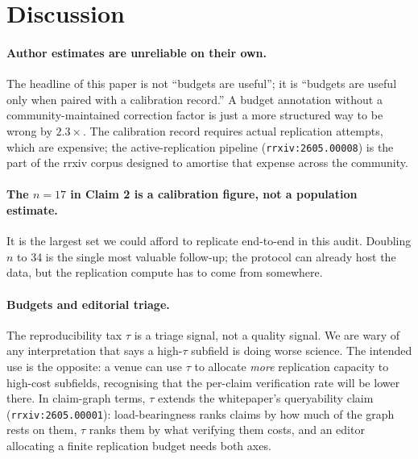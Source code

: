 \documentclass{rrxiv}
\begin{document}
\section{Discussion}\label{sec:discussion}

\paragraph{Author estimates are unreliable on their own.} The headline of this paper is not ``budgets are useful''; it is ``budgets are useful only when paired with a calibration record.'' A budget annotation without a community-maintained correction factor is just a more structured way to be wrong by $2.3\times$. The calibration record requires actual replication attempts, which are expensive; the active-replication pipeline (\texttt{rrxiv:2605.00008}) is the part of the rrxiv corpus designed to amortise that expense across the community.

\paragraph{The $n=17$ in Claim 2 is a calibration figure, not a population estimate.} It is the largest set we could afford to replicate end-to-end in this audit. Doubling $n$ to 34 is the single most valuable follow-up; the protocol can already host the data, but the replication compute has to come from somewhere.

\paragraph{Budgets and editorial triage.} The reproducibility tax $\tau$ is a triage signal, not a quality signal. We are wary of any interpretation that says a high-$\tau$ subfield is doing worse science. The intended use is the opposite: a venue can use $\tau$ to allocate \emph{more} replication capacity to high-cost subfields, recognising that the per-claim verification rate will be lower there. In claim-graph terms, $\tau$ extends the whitepaper's queryability claim (\texttt{rrxiv:2605.00001}): load-bearingness ranks claims by how much of the graph rests on them, $\tau$ ranks them by what verifying them costs, and an editor allocating a finite replication budget needs both axes.
\end{document}
